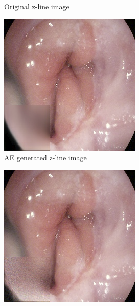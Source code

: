 \begin{figure}
\begin{subfigure}[t]{\myfigsizethree}
            \caption{Original z-line image}    
            \label{fig:z_ORIG_SQUARE1}
        \end{subfigure}
        \qquad
        \begin{subfigure}[t]{\myfigsizethree}   
            \centering 
            \includegraphics[width=\textwidth]{experiments/figures/greensquare/zAE.png}
            \caption{AE generated z-line image}    
            \label{fig:z_AE_SQUARE1}
        \end{subfigure}
        \qquad%
        \begin{subfigure}[t]{\myfigsizethree}   
            \centering 
            \includegraphics[width=\textwidth]{experiments/figures/greensquare/zGAN.png}

\end{subfigure}
\end{figure}
